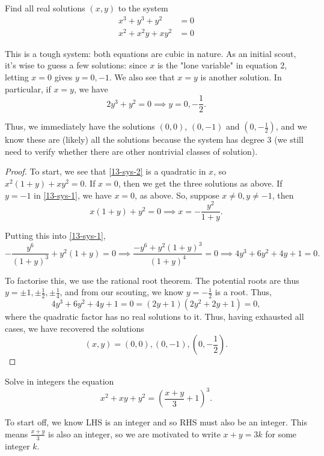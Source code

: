\documentclass[../main.tex]{subfiles}
\begin{document}
\begin{example}[2021 SMO(S) P22]
Find all real solutions $(x,y)$ to the system
\begin{align}
    x^3+y^3+y^2&=0 \label{13-sys-1} \\
    x^2+x^2y+xy^2&=0 \label{13-sys-2}
\end{align}
\end{example}
This is a tough system: both equations are cubic in nature. As an initial scout, it's wise to guess a few solutions: since $x$ is the "lone variable" in equation 2, letting $x=0$ gives $y=0, -1$. We also see that $x=y$ is another solution. In particular, if $x=y$, we have $$2y^3+y^2=0 \implies y=0, -\frac{1}{2}.$$

Thus, we immediately have the solutions $(0,0)$, $(0,-1)$ and $(0, -\frac{1}{2})$, and we know these are (likely) all the solutions because the system has degree 3 (we still need to verify whether there are other nontrivial classes of solution).

\begin{proof}
    To start, we see that \eqref{13-sys-2} is a quadratic in $x$, so $x^2(1+y)+xy^2=0.$ If $x=0$, then we get the three solutions as above. If $y=-1$ in \eqref{13-sys-1}, we have $x=0$, as above. So, suppose $x\neq 0, y\neq -1$, then
$$x(1+y)+y^2=0 \implies x=-\frac{y^2}{1+y}.$$

Putting this into \eqref{13-sys-1}, 
$$-\frac{y^6}{(1+y)^3}+y^2(1+y)=0 \implies \frac{-y^6+y^2(1+y)^3}{(1+y)^4}=0 \implies 4y^3+6y^2+4y+1=0.$$

To factorise this, we use the rational root theorem. The potential roots are thus $y=\pm 1, \pm \frac{1}{2}, \pm\frac{1}{4}$, and from our scouting, we know $y=-\frac{1}{2}$ is a root. Thus,
$$4y^3+6y^2+4y+1=0=(2y+1)(2y^2+2y+1)=0,$$
where the quadratic factor has no real solutions to it. Thus, having exhausted all cases, we have recovered the solutions
$$\boxed{(x,y)=(0,0), (0,-1), (0,-\frac{1}{2})}.$$
\end{proof}

\begin{example}
Solve in integers the equation
$$x^2+xy+y^2=\left(\frac{x+y}{3}+1\right)^3.$$
\end{example}
To start off, we know LHS is an integer and so RHS must also be an integer. This means $\frac{x+y}{3}$ is also an integer, so we are motivated to write $x+y=3k$ for some integer $k$.
\end{document}
